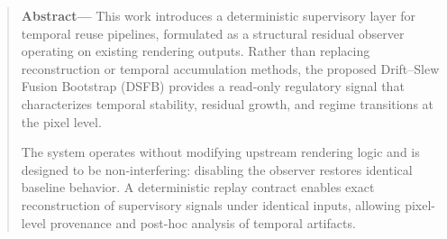 \documentclass[11pt,letterpaper]{article}
\theoremstyle{gcresult}
\theoremstyle{definition}
\begin{document}
\begin{abstract}
\textbf{Abstract—}
This work introduces a deterministic supervisory layer for temporal reuse pipelines, formulated as a structural residual observer operating on existing rendering outputs. Rather than replacing reconstruction or temporal accumulation methods, the proposed Drift–Slew Fusion Bootstrap (DSFB) provides a read-only regulatory signal that characterizes temporal stability, residual growth, and regime transitions at the pixel level.

The system operates without modifying upstream rendering logic and is designed to be non-interfering: disabling the observer restores identical baseline behavior. A deterministic replay contract enables exact reconstruction of supervisory signals under identical inputs, allowing pixel-level provenance and post-hoc analysis of temporal artifacts.


\end{abstract}
\end{document}
